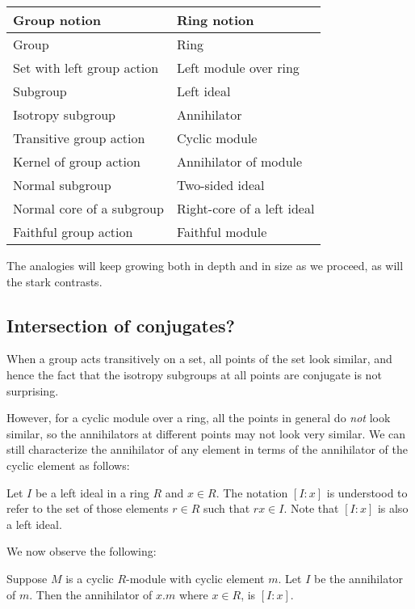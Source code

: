 \documentclass[a4paper]{amsart}
\begin{document}
\begin{tabular}{|l|l|}
  \hline
  Group notion & Ring notion \\
  \hline
  Group & Ring \\
  Set with left group action & Left module over ring\\
  Subgroup & Left ideal\\
  Isotropy subgroup & Annihilator\\
  Transitive group action & Cyclic module\\
  Kernel of group action & Annihilator of module\\
  Normal subgroup & Two-sided ideal\\
  Normal core of a subgroup & Right-core of a left ideal\\
  Faithful group action & Faithful module\\
  \hline
\end{tabular}

The analogies will keep growing both in depth and in size as we
proceed, as will the stark contrasts. 

\subsection{Intersection of conjugates?}

When a group acts transitively on a set, all points of the set look
similar, and hence the fact that the isotropy subgroups at all points
are conjugate is not surprising.

However, for a cyclic module over a ring, all the points in general do
{\em not} look similar, so the annihilators at different points may
not look very similar. We can still characterize the annihilator
of any element in terms of the annihilator of the cyclic element as follows:

\begin{definer}
  Let $I$ be a left ideal in a ring $R$ and $x \in R$. The notation
  $[I:x]$ is understood to refer to the set of those elements $r \in
  R$ such that $rx \in I$. Note that $[I:x]$ is also a left ideal.
\end{definer}

We now observe the following:

\begin{definer}
  Suppose $M$ is a cyclic $R$-module with cyclic element $m$. Let $I$
  be the annihilator of $m$. Then the annihilator of $x.m$ where $x \in
  R$, is $[I:x]$.
\end{definer}
\end{document}
